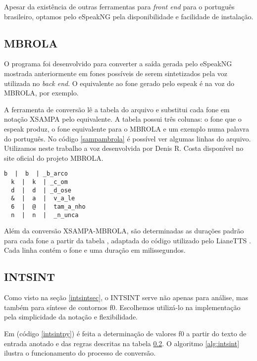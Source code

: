 Apesar da existência de outras ferramentas para \emph{front end} para o
português brasileiro, optamos pelo eSpeakNG pela disponibilidade e facilidade de
instalação.


\subsection{MBROLA}
O programa  foi desenvolvido para converter a saída gerada
pelo eSpeakNG mostrada anteriormente em fones possíveis de serem sintetizados
pela voz utilizada no \emph{back end}. O equivalente ao fone \code{/&/} gerado
pelo espeak é  na voz do MBROLA, por exemplo.

A ferramenta de conversão lê a tabela do arquivo  e
substitui cada fone em notação XSAMPA pelo equivalente. A tabela possui três
colunas: o fone que o espeak produz, o fone equivalente para o MBROLA e um
exemplo numa palavra do português. No código \ref{sampambrola} é possível ver
algumas linhas do arquivo. Utilizamos neste trabalho a voz 
desenvolvida por Denis R. Costa disponível no site oficial do projeto MBROLA.

\begin{lstlisting}[caption=Extrato de linhas da tabela de conversão, label=sampambrola]
  b  |  b  | _b_arco
  k  |  k  | _c_om
  d  |  d  | _d_ose
  &  |  a  |  v_a_le
  6  |  @  |  tam_a_nho
  n  |  n  |  _n_unca
\end{lstlisting}

Além da conversão XSAMPA-MBROLA, são determinadas as durações padrão para cada
fone a partir da tabela , adaptada do código utilizado pelo
LianeTTS \cite{lianetts}. Cada linha contém o fone e uma duração em milissegundos.

\subsection{INTSINT}
\label{intsintrules}
Como visto na seção \ref{intsintsec}, o INTSINT serve não apenas para análise,
mas também para síntese de contornos f0. Escolhemos utilizá-lo na implementação
pela simplicidade da notação e flexibilidade.

Em  (código \ref{intsintpy}) é feita a determinação de valores f0 a partir do texto de
entrada anotado e das regras descritas na tabela \ref{intsintrules}. O
algoritmo \ref{alg:intsint} ilustra o funcionamento do processo de conversão.

